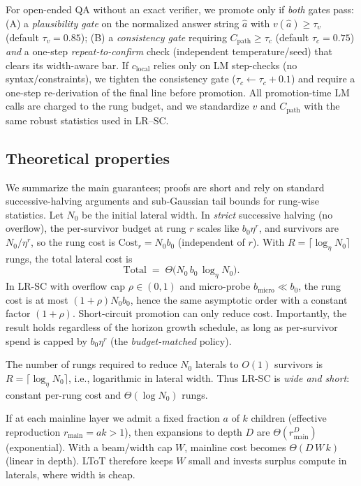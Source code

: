 \documentclass{article}
\begin{document}
\vspace{0.5em}
For open-ended QA without an exact verifier, we promote only if \emph{both} gates pass:
(A) a \emph{plausibility gate} on the normalized answer string $\hat a$ with $v(\hat a)\ge \tau_v$ (default $\tau_v{=}0.85$);
(B) a \emph{consistency gate} requiring $C_{\text{path}}\ge \tau_c$ (default $\tau_c{=}0.75$) \emph{and} a one-step \emph{repeat-to-confirm} check (independent temperature/seed) that clears its width-aware bar.
If $c_{\text{local}}$ relies only on LM step-checks (no syntax/constraints), we tighten the consistency gate ($\tau_c\leftarrow\tau_c{+}0.1$) and require a one-step re-derivation of the final line before promotion.
All promotion-time LM calls are charged to the rung budget, and we standardize $v$ and $C_{\text{path}}$ with the same robust statistics used in LR--SC.

\subsection{Theoretical properties}
\label{sec:theory}

We summarize the main guarantees; proofs are short and rely on standard successive-halving arguments and sub-Gaussian tail bounds for rung-wise statistics.
Let $N_0$ be the initial lateral width.
In \emph{strict} successive halving (no overflow), the per-survivor budget at rung $r$ scales like $b_0\eta^r$, and survivors are $N_0/\eta^r$, so the rung cost is $\text{Cost}_r = N_0 b_0$ (independent of $r$).
With $R=\lceil\log_\eta N_0\rceil$ rungs, the total lateral cost is
\[
\boxed{~~\text{Total} \;=\; \Theta\!\big(N_0\,b_0\,\log_\eta N_0\big).~~}
\]
In LR-SC with overflow cap $\rho\in(0,1)$ and micro-probe $b_{\text{micro}}\ll b_0$, the rung cost is at most $(1+\rho)N_0 b_0$, hence the same asymptotic order with a constant factor $(1+\rho)$.
Short-circuit promotion can only reduce cost.
Importantly, the result holds regardless of the horizon growth schedule, as long as per-survivor spend is capped by $b_0\eta^r$ (the \emph{budget-matched} policy).

The number of rungs required to reduce $N_0$ laterals to $O(1)$ survivors is
$R=\lceil \log_\eta N_0\rceil$, i.e., logarithmic in lateral width.
Thus LR-SC is \emph{wide and short}: constant per-rung cost and $\Theta(\log N_0)$ rungs.

If at each mainline layer we admit a fixed fraction $a$ of $k$ children (effective reproduction $r_{\text{main}}=ak>1$), then expansions to depth $D$ are $\Theta(r_{\text{main}}^D)$ (exponential).
With a beam/width cap $W$, mainline cost becomes $\Theta(D\,W\,k)$ (linear in depth).
LToT therefore keeps $W$ small and invests surplus compute in laterals, where width is cheap.
\end{document}
